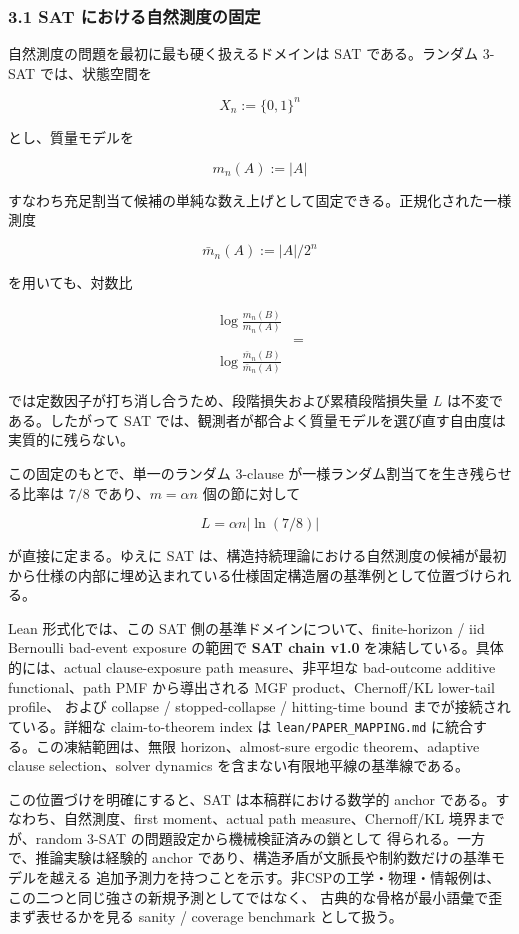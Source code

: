 \documentclass[12pt,a4paper]{article}
\begin{document}
\subsubsection{3.1 SAT における自然測度の固定}\label{sat-ux306bux304aux3051ux308bux81eaux7136ux6e2cux5ea6ux306eux56faux5b9a}

自然測度の問題を最初に最も硬く扱えるドメインは SAT である。ランダム 3-SAT では、状態空間を

\[
X_{n} := \{0,1\}^n
\]

とし、質量モデルを

\[
m_{n}(A) := |A|
\]

すなわち充足割当て候補の単純な数え上げとして固定できる。正規化された一様測度

\[
\bar m_{n}(A) := |A| / 2^n
\]

を用いても、対数比

\[
\begin{aligned}
\log \frac{m_{n}(B)}{m_{n}(A)} \\
&= \\
\log \frac{\bar m_{n}(B)}{\bar m_{n}(A)}
\end{aligned}
\]

では定数因子が打ち消し合うため、段階損失および累積段階損失量 \(L\) は不変である。したがって SAT では、観測者が都合よく質量モデルを選び直す自由度は実質的に残らない。

この固定のもとで、単一のランダム 3-clause が一様ランダム割当てを生き残らせる比率は \(7/8\) であり、\(m=\alpha n\) 個の節に対して

\[
L = \alpha n |\ln(7/8)|
\]

が直接に定まる。ゆえに SAT は、構造持続理論における自然測度の候補が最初から仕様の内部に埋め込まれている仕様固定構造層の基準例として位置づけられる。

Lean 形式化では、この SAT 側の基準ドメインについて、finite-horizon / iid Bernoulli bad-event exposure の範囲で \textbf{SAT chain v1.0} を凍結している。具体的には、actual clause-exposure path measure、非平坦な bad-outcome additive functional、path PMF から導出される MGF product、Chernoff/KL lower-tail profile、 および collapse / stopped-collapse / hitting-time bound までが接続されている。詳細な claim-to-theorem index は \texttt{lean/PAPER\_MAPPING.md} に統合する。この凍結範囲は、無限 horizon、almost-sure ergodic theorem、adaptive clause selection、solver dynamics を含まない有限地平線の基準線である。

この位置づけを明確にすると、SAT は本稿群における数学的 anchor である。すなわち、自然測度、first moment、actual path measure、Chernoff/KL 境界までが、random 3-SAT の問題設定から機械検証済みの鎖として 得られる。一方で、推論実験は経験的 anchor であり、構造矛盾が文脈長や制約数だけの基準モデルを越える 追加予測力を持つことを示す。非CSPの工学・物理・情報例は、この二つと同じ強さの新規予測としてではなく、 古典的な骨格が最小語彙で歪まず表せるかを見る sanity / coverage benchmark として扱う。
\end{document}
